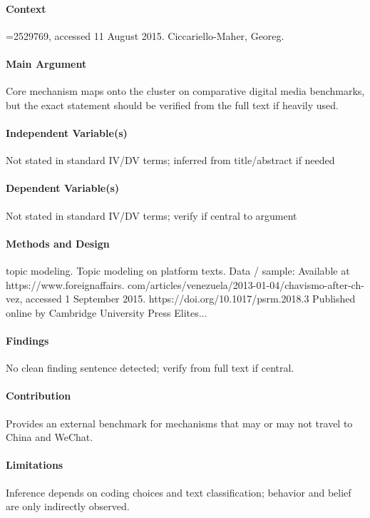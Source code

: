 \documentclass[12pt]{article}
\begin{document}
\paragraph{Context} =2529769, accessed 11 August 2015. Ciccariello-Maher, Georeg.

\paragraph{Main Argument} Core mechanism maps onto the cluster on comparative digital media benchmarks, but the exact statement should be verified from the full text if heavily used.

\paragraph{Independent Variable(s)} Not stated in standard IV/DV terms; inferred from title/abstract if needed

\paragraph{Dependent Variable(s)} Not stated in standard IV/DV terms; verify if central to argument

\paragraph{Methods and Design} topic modeling. Topic modeling on platform texts. Data / sample: Available at https://www.foreignaffairs. com/articles/venezuela/2013-01-04/chavismo-after-ch-vez, accessed 1 September 2015. https://doi.org/10.1017/psrm.2018.3 Published online by Cambridge University Press Elites...

\paragraph{Findings} No clean finding sentence detected; verify from full text if central.

\paragraph{Contribution} Provides an external benchmark for mechanisms that may or may not travel to China and WeChat.

\paragraph{Limitations} Inference depends on coding choices and text classification; behavior and belief are only indirectly observed.
\end{document}
